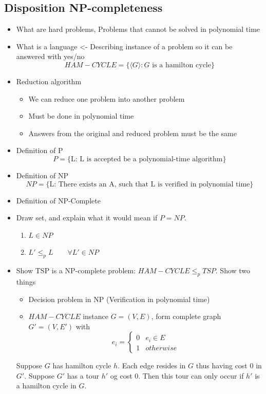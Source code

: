 \documentclass[10pt]{article}
\begin{document}
\subsection{Disposition NP-completeness} %
\label{sub:disposition_np_completeness}
\begin{itemize}
  \item What are hard problems, Problems that cannot be solved in polynomial time
  \item What is a language <- Describing instance of a problem so it can be answered with yes/no
  \begin{equation}
  HAM-CYCLE = \{\langle G \rangle: G \text{ is a hamilton cycle}\}   
  \end{equation}
  \item Reduction algorithm
  \begin{itemize}
    \item We can reduce one problem into another problem
    \item Must be done in polynomial time
    \item Answers from the original and reduced problem must be the same
  \end{itemize}
  \item Definition of P 
  \begin{equation}
    P = \{\text{L: L is accepted be a polynomial-time algorithm}\}
  \end{equation}
  \item Definition of NP
  \begin{equation}
    NP = \{\text{L: There exists an A, such that L is verified in polynomial time}\}
  \end{equation}
  \item Definition of NP-Complete
  \item Draw set, and explain what it would mean if $P = NP$.
  \begin{enumerate}
    \item $L \in NP$
    \item $L' \leq_p L \qquad \forall L' \in NP$
  \end{enumerate} 
  \item Show TSP is a NP-complete problem: $HAM-CYCLE \leq_p TSP$. Show two things
  \begin{itemize}
    \item Decision problem in NP (Verification in polynomial time)
    \item $HAM-CYCLE$ instance $G = (V,E)$, form complete graph $G' = (V,E')$ with
    \begin{equation} 
    e_i = 
    \left\{
    \begin{array}{rl} 
       0 &  e_i \in E\\
       1 &  otherwise
    \end{array} 
    \right. 
    \end{equation} 
  \end{itemize}
  Suppose $G$ has hamilton cycle $h$. Each edge resides in $G$ thus having cost 0 in $G'$. Suppose $G'$ has a tour $h'$ og cost 0. Then this tour can only occur if $h'$ is a hamilton cycle in $G$. 
\end{itemize}
\newpage
\end{document}
